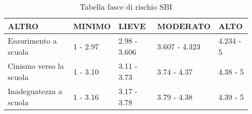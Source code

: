 \begin{table}[h!]
\begin{tabular}{| m{10em} | m{4.7em} | m{5em} | m{6.7em} | m{3.8em} |}
 \arrayrulecolor{Lines}\hline
 \rowcolor{Gray}
 \textbf{ALTRO} & \textbf{MINIMO} & \textbf{LIEVE} & \textbf{MODERATO} & \textbf{ALTO} \\
 \hline
 \cellcolor{None} Esaurimento a scuola & \cellcolor{Minimo} 1 - 2.97 & \cellcolor{Lieve} 2.98 - 3.606 & \cellcolor{Moderato} 3.607 - 4.323 & \cellcolor{Alto} 4.234 - 5 \\
 \hline
 \cellcolor{None} Cinismo verso la scuola & \cellcolor{Minimo} 1 - 3.10 & \cellcolor{Lieve} 3.11 - 3.73 & \cellcolor{Moderato} 3.74 - 4.37 & \cellcolor{Alto} 4.38 - 5 \\
 \hline
 \cellcolor{None} Inadeguatezza a scuola & \cellcolor{Minimo} 1 - 3.16 & \cellcolor{Lieve} 3.17 - 3.78 & \cellcolor{Moderato} 3.79 - 4.38 & \cellcolor{Alto} 4.39 - 5 \\
 \hline
\end{tabular}
\caption{Tabella fasce di rischio SBI}
\label{table:sbi}
\end{table}